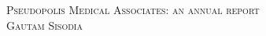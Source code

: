 \documentclass[11pt]{amsart}
\begin{document}
\begingroup
  \centering
  \large \scshape{Pseudopolis Medical Associates: an annual report}\\[1.5em]
  \large Gautam Sisodia\par
\endgroup









\end{document}
